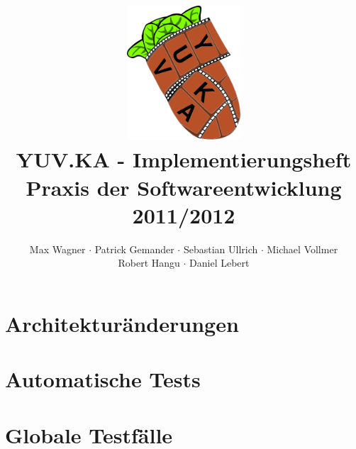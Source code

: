 \documentclass{scrartcl}
\begin{document}
\title{
    \hspace{-0.5cm} \includegraphics[height=5cm]{../../pflichtenheft/resources/logo.png} \\[1cm]
    \Huge{YUV.KA - Implementierungsheft} \\ \large{Praxis der Softwareentwicklung 2011/2012}
}
\author{Max Wagner $\cdot$ Patrick Gemander $\cdot$ Sebastian Ullrich $\cdot$ Michael Vollmer \\ Robert Hangu $\cdot$ Daniel Lebert}
\maketitle

\newpage
\mbox{}
\newpage
\mbox{}

\tableofcontents
\clearpage

\section{Architekturänderungen}

\clearpage

\section{Automatische Tests}

\clearpage

\section{Globale Testfälle}

\clearpage


\end{document}
